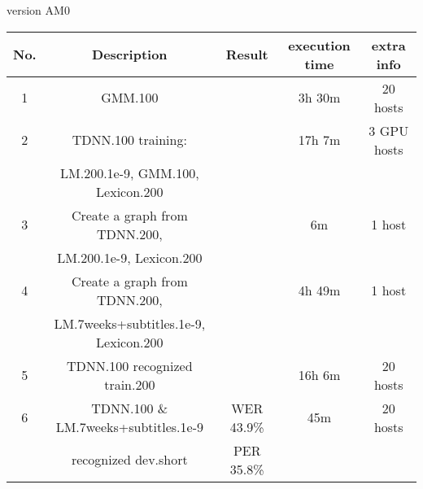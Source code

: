 version AM0
\begin{center}
\begin{tabular}{ | c | c | c | c |  c |  }
\hline
\textbf{No.} & \textbf{Description} & \textbf{Result} & \textbf{execution time} & \textbf{extra info} \\ \hline \hline
1 & GMM.100  &  & 3h 30m & 20 hosts \\  \hline

2 & TDNN.100 training: & & 17h 7m & 3 GPU hosts \\ 
 & LM.200.1e-9,  GMM.100, Lexicon.200 &  & & \\ \hline
 
3 & Create a graph from TDNN.200,  &  & 6m & 1 host \\  
 & LM.200.1e-9, Lexicon.200  & & & \\ \hline

4 & Create a graph from TDNN.200,  &   & 4h 49m & 1 host \\  
 & LM.7weeks+subtitles.1e-9, Lexicon.200  & & & \\ \hline

5 & TDNN.100 recognized train.200 &  & 16h 6m & 20 hosts \\  \hline 

6 & TDNN.100 \& LM.7weeks+subtitles.1e-9 & WER 43.9\%   & 45m & 20 hosts \\  
&  recognized dev.short & PER 35.8\% & & \\ \hline

\end{tabular}
\end{center}


